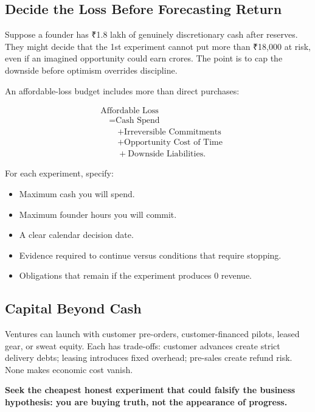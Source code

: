 \subsection{Decide the Loss Before Forecasting Return}

Suppose a founder has ₹1.8 lakh of genuinely discretionary cash after reserves. They might decide that the 1st experiment cannot put more than ₹18,000 at risk, even if an imagined opportunity could earn crores. The point is to cap the downside before optimism overrides discipline.

An affordable-loss budget includes more than direct purchases:

\begin{equation}
\begin{aligned}
&\text{Affordable Loss} \\
&\quad = \text{Cash Spend} \\
&\qquad + \text{Irreversible Commitments} \\
&\qquad + \text{Opportunity Cost of Time} \\
&\qquad + \text{Downside Liabilities}.
\end{aligned}
\end{equation}

For each experiment, specify:
\begin{itemize}[leftmargin=11pt,itemsep=1.5pt,topsep=1.5pt,parsep=0pt]
  \item Maximum cash you will spend.
  \item Maximum founder hours you will commit.
  \item A clear calendar decision date.
  \item Evidence required to continue versus conditions that require stopping.
  \item Obligations that remain if the experiment produces 0 revenue.
\end{itemize}

\subsection{Capital Beyond Cash}

Ventures can launch with customer pre-orders, customer-financed pilots, leased gear, or sweat equity. Each has trade-offs: customer advances create strict delivery debts; leasing introduces fixed overhead; pre-sales create refund risk. None makes economic cost vanish.

\textbf{Seek the cheapest honest experiment that could falsify the business hypothesis: you are buying truth, not the appearance of progress.}
